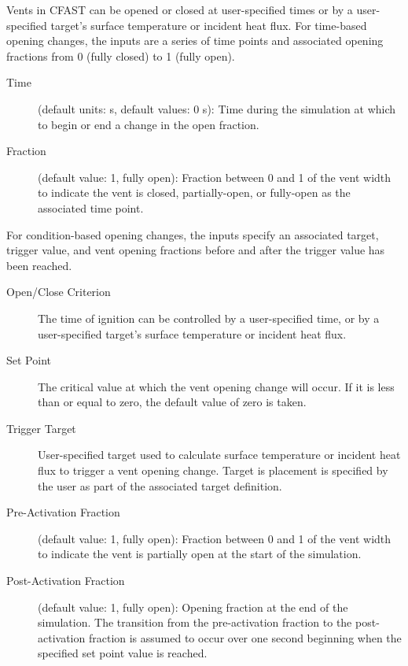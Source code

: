 Vents in CFAST can be opened or closed at user-specified times or by a user-specified target's surface temperature or incident heat flux. For time-based opening changes, the inputs are a series of time points and associated opening fractions from 0 (fully closed) to 1 (fully open).

\begin{description}
\item[Time] (default units: s, default values: 0 s): Time during the simulation at which to begin or end a change in the open fraction.
\item[Fraction] (default value: 1, fully open): Fraction between 0 and 1 of the vent width to indicate the vent is closed, partially-open, or fully-open as the associated time point.
\end{description}


For condition-based opening changes, the inputs specify an associated target, trigger value, and vent opening fractions before and after the trigger value has been reached.

\begin{description}
\item[Open/Close Criterion] The time of ignition can be controlled by a user-specified time, or by a user-specified target's surface temperature or incident heat flux.
\item[Set Point] The critical value at which the vent opening change will occur. If it is less than or equal to zero, the default value of zero is taken.
\item[Trigger Target] User-specified target used to calculate surface temperature or incident heat flux to trigger a vent opening change. Target is placement is specified by the user as part of the associated target definition.
\item[Pre-Activation Fraction] (default value: 1, fully open): Fraction between 0 and 1 of the vent width to indicate the vent is partially open at the start of the simulation.
\item[Post-Activation Fraction] (default value: 1, fully open): Opening fraction at the end of the simulation. The transition from the pre-activation fraction to the post-activation fraction is assumed to occur over one second beginning when the specified set point value is reached.
\end{description}




